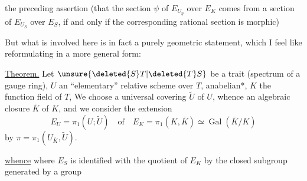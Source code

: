the preceding assertion (that the section $\psi$ of $E_{U_\eta}$ over $E_K$ comes from a section of $E_{U_S}$ over $E_S$, if and only if the corresponding rational section is morphic)

But what is involved here is in fact a purely geometric statement, which I feel like reformulating in a more general form:

\uline{Theorem.}  Let $\unsure{\deleted{S}T|\deleted{T}S}$ be a trait (spectrum of a gauge ring), $U$ an ``elementary'' relative scheme over $T$, anabelian*, $K$ the function field of $T$, We choose a universal covering $\widetilde U$ of $U$, whence an algebraic closure $\overline K$ of $K$, and we consider the extension
\[
E_U=\pi_1(U;\widetilde U)\quad\text{of}\quad E_K=\pi_1(K,\overline K)\simeq\operatorname{Gal}(\overline K/K)
\]
by $\pi=\pi_1(U_{\overline K},\widetilde U)$.   \unsure{\deleted{,}|,} 

\uline{whence}
where $E_S$ is identified with the quotient of $E_K$ by the  closed subgroup generated by a group
